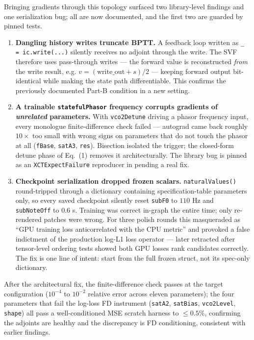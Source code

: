 \documentclass[10pt]{article}
\newcommand{\code}[1]{\texttt{#1}}
\begin{document}
Bringing gradients through this topology surfaced two library-level findings and one serialization bug; all are now documented, and the first two are guarded by pinned tests.

\begin{enumerate}
  \item \textbf{Dangling history writes truncate BPTT.} A feedback loop written as \code{\_ = ic.write(...)} silently receives no adjoint through the write. The SVF therefore uses pass-through writes --- the forward value is reconstructed \emph{from} the write result, e.g. $v = (\mathrm{write\_out} + s)/2$ --- keeping forward output bit-identical while making the state path differentiable. This confirms the previously documented Part-B condition in a new setting.
  \item \textbf{A trainable \code{statefulPhasor} frequency corrupts gradients of \emph{unrelated} parameters.} With \code{vco2Detune} driving a phasor frequency input, every monologue finite-difference check failed --- autograd came back roughly $10\times$ too small with wrong signs on parameters that do not touch the phasor at all (\code{fBase}, \code{satA3}, \code{res}). Bisection isolated the trigger; the closed-form detune phase of Eq.~(1) removes it architecturally. The library bug is pinned as an \code{XCTExpectFailure} reproducer in  pending a real fix.
  \item \textbf{Checkpoint serialization dropped frozen scalars.} \code{naturalValues()} round-tripped through a dictionary containing specification-table parameters only, so every saved checkpoint silently reset \code{subF0} to $110$ Hz and \code{subNoteOff} to $0.6$ s. Training was correct in-graph the entire time; only re-rendered patches were wrong. For three polish rounds this masqueraded as ``GPU training loss anticorrelated with the CPU metric'' and provoked a false indictment of the production log-L1 loss operator --- later retracted after tensor-level ordering tests showed both GPU losses rank candidates correctly. The fix is one line of intent: start from the full frozen struct, not its spec-only dictionary.
\end{enumerate}

After the architectural fix, the finite-difference check passes at the target configuration ($10^{-4}$ to $10^{-2}$ relative error across eleven parameters); the four parameters that fail the log-loss FD instrument (\code{satA2}, \code{satBias}, \code{vco2Level}, \code{shape}) all pass a well-conditioned MSE scratch harness to $\le 0.5\%$, confirming the adjoints are healthy and the discrepancy is FD conditioning, consistent with earlier findings.
\end{document}
